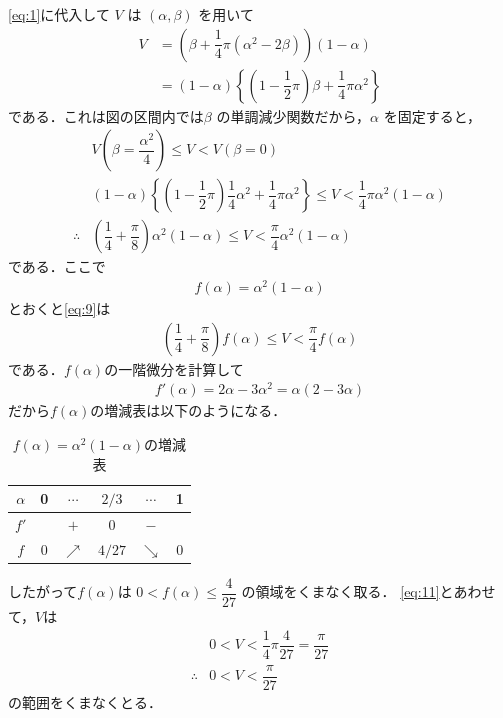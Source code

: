 \documentclass[../../main.tex]{subfiles}
\begin{document}
\cref{eq:1}に代入して $V$ は $(\alpha,\beta)$ を用いて
\begin{align}
  V
  &= \left(\beta + \dfrac{1}{4}\pi (\alpha^2 - 2\beta)\right)(1-\alpha) \\
  &= (1-\alpha) \left\{ (1 - \dfrac{1}{2}\pi)\beta + \dfrac{1}{4}\pi \alpha^2 \right\} \label{eq:8}
\end{align}
である．これは図の区間内では$\beta$ の単調減少関数だから，$\alpha$ を固定すると，
\begin{align}
  & V\left(\beta = \dfrac{\alpha^2}{4}\right) \le V < V(\beta = 0) \\
  & (1-\alpha) \left\{ (1-\dfrac{1}{2}\pi)\dfrac{1}{4}\alpha^2 + \dfrac{1}{4}\pi \alpha^2 \right\} \le V < \dfrac{1}{4}\pi \alpha^2 (1-\alpha) \\
  \therefore
  & \left(\dfrac{1}{4}+\dfrac{\pi}{8}\right)\alpha^2(1-\alpha) \le V
  < \dfrac{\pi}{4}\alpha^2(1-\alpha) \label{eq:9}
\end{align}
である．ここで
\begin{align}
  f(\alpha) = \alpha^2(1-\alpha) \label{eq:10}
\end{align}
とおくと\cref{eq:9}は
\begin{align}
  \left(\dfrac{1}{4}+\dfrac{\pi}{8}\right) f(\alpha) \le V < \dfrac{\pi}{4} f(\alpha) \label{eq:11}
\end{align}
である．$f(\alpha)$の一階微分を計算して
\begin{align}
  f'(\alpha) = 2\alpha - 3\alpha^2 = \alpha(2-3\alpha)
\end{align}
だから$f(\alpha)$の増減表は以下のようになる．

\begin{table}[htb]
  \centering
  \caption{$f(\alpha)=\alpha^2(1-\alpha)$の増減表}
  \begin{tabular}{|c|c|c|c|c|c|}
    \hline
    $\alpha$ & 0 & $\cdots$ & $2/3$ & $\cdots$ & 1 \\
    \hline
    $f'$ & & $+$ & 0 & $-$ & \\
    \hline
    $f$ & 0 & $\nearrow$ & $4/27$ & $\searrow$ & 0 \\
    \hline
  \end{tabular}
\end{table}

したがって$f(\alpha)$は $0 < f(\alpha) \le \dfrac{4}{27}$ の領域をくまなく取る．
\cref{eq:11}とあわせて，$V$は
\begin{align}
  & 0 < V < \dfrac{1}{4}\pi \dfrac{4}{27} = \dfrac{\pi}{27} \\
  \therefore
  &0 < V < \dfrac{\pi}{27}
\end{align}
の範囲をくまなくとる．
\end{document}
